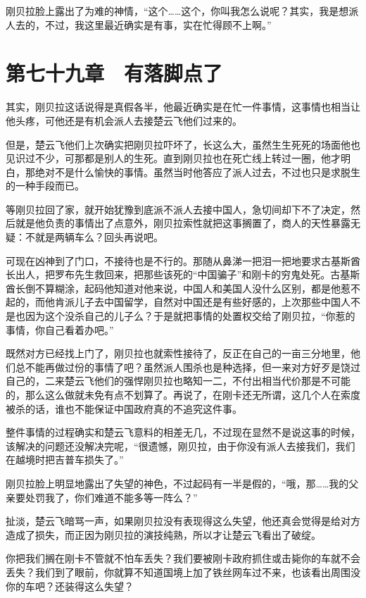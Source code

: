 刚贝拉脸上露出了为难的神情，“这个……这个，你叫我怎么说呢？其实，我是想派人去的，不过，我这里最近确实是有事，实在忙得顾不上啊。”

\section{第七十九章　有落脚点了}

其实，刚贝拉这话说得是真假各半，他最近确实是在忙一件事情，这事情也相当让他头疼，可他还是有机会派人去接楚云飞他们过来的。

但是，楚云飞他们上次确实把刚贝拉吓坏了，长这么大，虽然生生死死的场面他也见识过不少，可那都是别人的生死。直到刚贝拉也在死亡线上转过一圈，他才明白，那绝对不是什么愉快的事情。虽然当时他答应了派人过去，不过也只是求脱生的一种手段而已。

等刚贝拉回了家，就开始犹豫到底派不派人去接中国人，急切间却下不了决定，然后就是他负责的事情出了点意外，刚贝拉索性就把这事搁置了，商人的天性暴露无疑：不就是两辆车么？回头再说吧。

可现在凶神到了门口，不接待也是不行的。那随从鼻涕一把泪一把地要求古基斯酋长出人，把罗布先生救回来，把那些该死的“中国骗子”和刚卡的穷鬼处死。古基斯酋长倒不算糊涂，起码他知道对他来说，中国人和美国人没什么区别，都是他惹不起的，而他肯派儿子去中国留学，自然对中国还是有些好感的，上次那些中国人不是也因为这个没杀自己的儿子么？于是就把事情的处置权交给了刚贝拉，“你惹的事情，你自己看着办吧。”

既然对方已经找上门了，刚贝拉也就索性接待了，反正在自己的一亩三分地里，他们总不能再做过份的事情了吧？虽然派人围杀也是种选择，但一来对方好歹是饶过自己的，二来楚云飞他们的强悍刚贝拉也略知一二，不付出相当代价那是不可能的，那么这么做就未免有点不划算了。再说了，在刚卡还无所谓，这几个人在索度被杀的话，谁也不能保证中国政府真的不追究这件事。

整件事情的过程确实和楚云飞意料的相差无几，不过现在显然不是说这事的时候，该解决的问题还没解决完呢，“很遗憾，刚贝拉，由于你没有派人去接我们，我们在越境时把吉普车损失了。”

刚贝拉脸上明显地露出了失望的神色，不过起码有一半是假的，“哦，那……我的父亲要处罚我了，你们难道不能多等一阵么？”

扯淡，楚云飞暗骂一声，如果刚贝拉没有表现得这么失望，他还真会觉得是给对方造成了损失，而正因为刚贝拉的演技纯熟，所以才让楚云飞看出了破绽。

你把我们搁在刚卡不管就不怕车丢失？我们要被刚卡政府抓住或击毙你的车就不会丢失？我们到了眼前，你就算不知道国境上加了铁丝网车过不来，也该看出周围没你的车吧？还装得这么失望？

